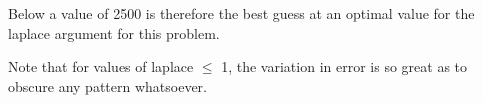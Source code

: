 \documentclass[11pt]{article}
\begin{document}
\begin{enumerate}
Below a value of 2500 is therefore the best guess at an optimal value for the laplace argument 
for this problem.

Note that for values of laplace $\le$ 1, the variation in error is so great as to obscure any pattern whatsoever. 

\begin{figure}[H]
\begin{center}
\quad{}
\end{center}
\end{figure}
\end{enumerate}
\end{document}

